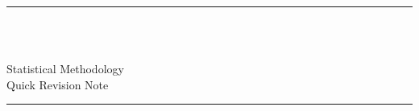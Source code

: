 \fancyhead[C]{}
\hrule \medskip
\begin{minipage}{0.295\textwidth} 
\raggedright
\footnotesize
\yourname \hfill\\
\yournetid \hfill\\
\yourgp
\end{minipage}
\begin{minipage}{0.4\textwidth} 
\centering 
\large
Statistical Methodology\\ 
\large 
Quick Revision Note  \assignmentnumber\\ 
\end{minipage}
\begin{minipage}{0.295\textwidth} 
\raggedleft
\end{minipage}
\medskip\hrule 
\bigskip
